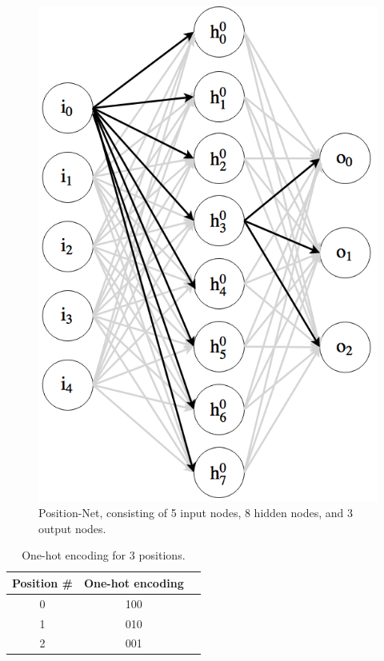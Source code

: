 \documentclass{article}
\begin{document}
\begin{figure}[h!]
\centering
\includegraphics[scale=0.3]{figs/position_net.png}
\caption{Position-Net, consisting of 5 input nodes, 8 hidden nodes, and 3 output nodes.}
\label{fig:position_net}
\end{figure}

\begin{table}[h!]
\begin{center}
\begin{tabular}{ c c c }
 Position \# & One-hot encoding \\ 
 \hline
 0 & 100 \\ 
 1 & 010 \\  
 2 & 001
\end{tabular}
\caption{One-hot encoding for 3 positions.}
\label{table:ohe}
\end{center}
\end{table}
\end{document}
